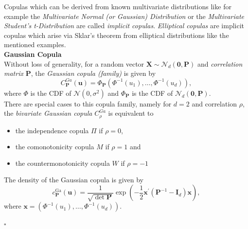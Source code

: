 
Copulas which can be derived from known multivariate distributions like for example the \textit{Multivariate Normal (or Gaussian) Distribution} or the \textit{Multivariate Student's t-Distribution} are called \textit{implicit copulas}. \textit{Elliptical copulas} are implicit copulas which arise via Sklar's theorem from elliptical distributions like the mentioned examples.\\

\textbf{Gaussian Copula}\\
Without loss of generality, for a random vector $\bm{X} \sim {\mathcal{N}_{d}(\bm{0}, \mathbf{P})} $ and \textit{correlation matrix} $\bm{P}$,
the \textit{Gaussian copula (family)} is given by
\begin{equation}
C_{\mathbf{P}}^{G a}(\mathbf{u})=\Phi_{\mathbf{P}}\left(\Phi^{-1}\left(u_{1}\right), \ldots, \Phi^{-1}\left(u_{d}\right)\right),
\end{equation}
where $\Phi$ is the \ac{CDF} of $\mathcal{N}(0, \sigma^{2})$ and 
$\Phi_{\bm{P}}$ is the \ac{CDF} of $\mathcal{N}_{d}(\bm{0}, \mathbf{P})$.\\
There are special cases to this copula family, namely for $d=2$ and correlation $\rho$, the \textit{bivariate Gaussian copula} $C_{\rho}^{G a}$ is equivalent to
\begin{itemize}
\item the independence copula $\Pi$ if $\rho = 0$,
\item the comonotonicity copula $M$ if $\rho = 1$ and
\item the countermonotonicity copula $W$ if $\rho = -1$
\end{itemize}
The density of the Gaussian copula is given by
\begin{equation}
c_{\bm{P}}^{\mathrm{Ga}}(\boldsymbol{u})=\frac{1}{\sqrt{\operatorname{det} \bm{P}}} \exp \left(-\frac{1}{2} \boldsymbol{x}^{\prime}\left(\bm{P}^{-1}-\bm{I}_{d}\right) \boldsymbol{x}\right),
\end{equation}
where $\bm{x} = \left(\Phi^{-1}\left(u_{1}\right), \ldots, \Phi^{-1}\left(u_{d}\right)\right)$.

\hfill $\square$ \\




